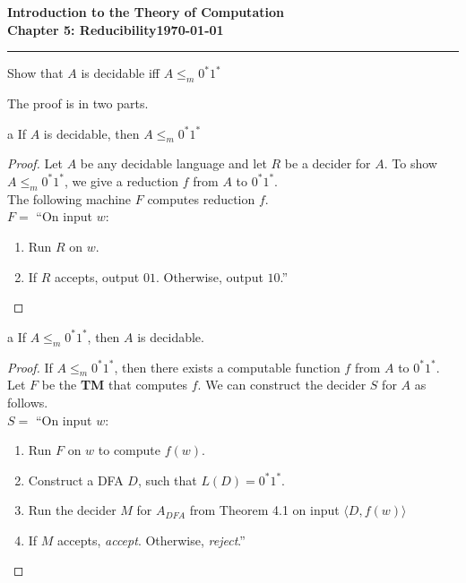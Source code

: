\documentclass[11pt]{article}
\newcommand{\dated}{\today}
\begin{document}
\textbf{Introduction to the Theory of
Computation}\hfill\textbf{\myname}\\[0.01in]
\textbf{Chapter 5: Reducibility}\hfill\textbf{\dated}\\
\smallskip\hrule\bigskip

\begin{problem}{5.23}
Show that $A$ is decidable iff $A \leq_m 0^{*}1^{*}$ 
\end{problem}

The proof is in two parts.

\begin{problem}[Part]{a}
If $A$ is decidable, then $A \leq_m 0^{*}1^{*}$ 
\end{problem}

\begin{proof}
Let $A$ be any decidable language and let $R$ be a decider for $A$. To show $A \leq_m 0^{*}1^{*}$, we give a reduction $f$ from $A$ to $0^{*}1^{*}$. \\

The following machine $F$ computes reduction $f$. \\

$F =$ \textquotedblleft On input $w$:
\begin{enumerate}
\item Run $R$ on $w$.
\item If $R$ accepts, output $01$. Otherwise, output $10$.\textquotedblright
\end{enumerate}
\end{proof}

\begin{problem}[Part]{a}
If $A \leq_m 0^{*}1^{*}$, then $A$ is decidable. 
\end{problem}

\begin{proof}
If $A \leq_m 0^{*}1^{*}$, then there exists a computable function $f$ from $A$ to $0^{*}1^{*}$. Let $F$ be the \textbf{TM} that computes $f$. We can construct the decider $S$ for $A$ as follows. \\

$S =$ \textquotedblleft On input $w$:
\begin{enumerate}
\item Run $F$ on $w$ to compute $f(w)$.
\item Construct a DFA $D$, such that $L(D) = 0^{*}1^{*}$.
\item Run the decider $M$ for $A_{DFA}$ from Theorem 4.1 on input $\langle D, f(w) \rangle$
\item If $M$ accepts, \textit{accept}. Otherwise, \textit{reject}.\textquotedblright
\end{enumerate}
\end{proof}
\end{document}
